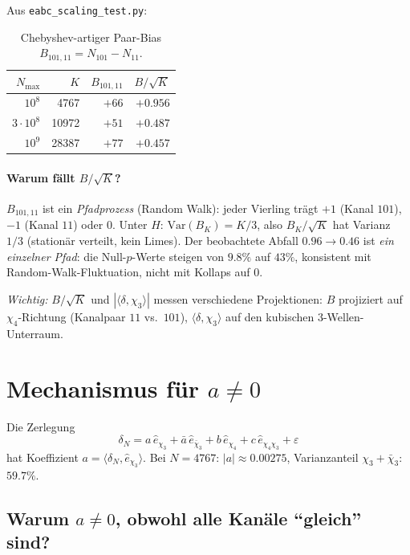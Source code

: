 \documentclass[11pt,a4paper]{article}
\newcommand{\Var}{\mathrm{Var}}
\begin{document}
Aus \texttt{eabc\_scaling\_test.py}:

\begin{table}[h]
\centering
\caption{Chebyshev-artiger Paar-Bias $B_{101,11}=N_{101}-N_{11}$.}
\label{tab:B}
\begin{tabular}{rrrr}
\toprule
$N_{\max}$ & $K$ & $B_{101,11}$ & $B/\sqrt{K}$ \\
\midrule
$10^8$    & 4767  & $+66$ & $+0.956$ \\
$3\cdot10^8$ & 10972 & $+51$ & $+0.487$ \\
$10^9$    & 28387 & $+77$ & $+0.457$ \\
\bottomrule
\end{tabular}
\end{table}

\paragraph{Warum fällt $B/\sqrt{K}$?}
$B_{101,11}$ ist ein \emph{Pfadprozess} (Random Walk):
jeder Vierling trägt $+1$ (Kanal $101$), $-1$ (Kanal $11$) oder $0$.
Unter $H$:
$\Var(B_K)=K/3$, also $B_K/\sqrt{K}$ hat Varianz $1/3$
(stationär verteilt, kein Limes).
Der beobachtete Abfall $0.96\to 0.46$ ist \emph{ein einzelner Pfad}:
die Null-$p$-Werte steigen von $9.8\%$ auf $43\%$,
konsistent mit Random-Walk-Fluktuation, nicht mit Kollaps auf $0$.

\emph{Wichtig:} $B/\sqrt{K}$ und $|\langle\delta,\chi_3\rangle|$ messen
verschiedene Projektionen:
$B$ projiziert auf $\chi_4$-Richtung (Kanalpaar $11$ vs.\ $101$),
$\langle\delta,\chi_3\rangle$ auf den kubischen $3$-Wellen-Unterraum.

\section{Mechanismus für $a\neq 0$}

Die Zerlegung
\[
  \delta_N = a\,\hat{e}_{\chi_3} + \bar{a}\,\hat{e}_{\bar{\chi}_3}
           + b\,\hat{e}_{\chi_4} + c\,\hat{e}_{\chi_4\chi_3} + \varepsilon
\]
hat Koeffizient $a=\langle\delta_N,\hat{e}_{\chi_3}\rangle$.
Bei $N=4767$: $|a|\approx 0.00275$, Varianzanteil $\chi_3+\bar{\chi}_3$: $59.7\%$.

\subsection{Warum $a\neq 0$, obwohl alle Kanäle ``gleich'' sind?}
\end{document}
